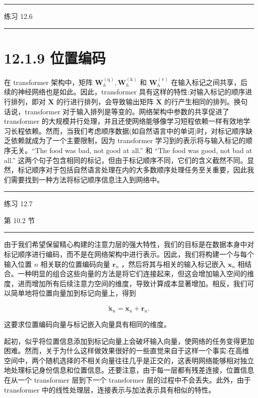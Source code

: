 \documentclass[10pt]{report}
\newcommand{\HRule}{\begin{center}\rule{0.9\linewidth}{0.2mm}\end{center}}
\begin{document}
\HRule

练习 12.6

\HRule

\section*{12.1.9 位置编码}

在 transformer 架构中，矩阵 \({\mathbf{W}}_{h}^{\left( \mathrm{q}\right) },{\mathbf{W}}_{h}^{\left( \mathrm{k}\right) }\) 和 \({\mathbf{W}}_{h}^{\left( \mathrm{v}\right) }\) 在输入标记之间共享，后续的神经网络也是如此。因此，transformer 具有这样的特性:对输入标记的顺序进行排列，即对 \(\mathbf{X}\) 的行进行排列，会导致输出矩阵 \(\widetilde{\mathbf{X}}\) 的行产生相同的排列。换句话说，transformer 对于输入排列是等变的。网络架构中参数的共享促进了 transformer 的大规模并行处理，并且还使网络能够像学习短程依赖一样有效地学习长程依赖。然而，当我们考虑顺序数据(如自然语言中的单词)时，对标记顺序缺乏依赖就成为了一个主要限制，因为 transformer 学习到的表示将与输入标记的顺序无关。“The food was bad, not good at all.” 和 “The food was good, not bad at all.” 这两个句子包含相同的标记，但由于标记顺序不同，它们的含义截然不同。显然，标记顺序对于包括自然语言处理在内的大多数顺序处理任务至关重要，因此我们需要找到一种方法将标记顺序信息注入到网络中。

\HRule

练习 12.7

第 10.2 节

\HRule

由于我们希望保留精心构建的注意力层的强大特性，我们的目标是在数据本身中对标记顺序进行编码，而不是在网络架构中进行表示。因此，我们将构建一个与每个输入位置 \(n\) 相关联的位置编码向量 \({\mathbf{r}}_{n}\) ，然后将其与相关的输入标记嵌入 \({\mathbf{x}}_{n}\) 相结合。一种明显的组合这些向量的方法是将它们连接起来，但这会增加输入空间的维度，进而增加所有后续注意力空间的维度，导致计算成本显著增加。相反，我们可以简单地将位置向量加到标记向量上，得到

\[
{\widetilde{\mathbf{x}}}_{n} = {\mathbf{x}}_{n} + {\mathbf{r}}_{n}. \tag{12.24}
\]

这要求位置编码向量与标记嵌入向量具有相同的维度。

起初，似乎将位置信息添加到标记向量上会破坏输入向量，使网络的任务变得更加困难。然而，关于为什么这样做效果很好的一些直觉来自于这样一个事实:在高维空间中，两个随机选择的不相关向量往往几乎是正交的，这表明网络能够相对独立地处理标记身份信息和位置信息。还要注意，由于每一层都有残差连接，位置信息在从一个 transformer 层到下一个 transformer 层的过程中不会丢失。此外，由于 transformer 中的线性处理层，连接表示与加法表示具有相似的特性。
\end{document}
